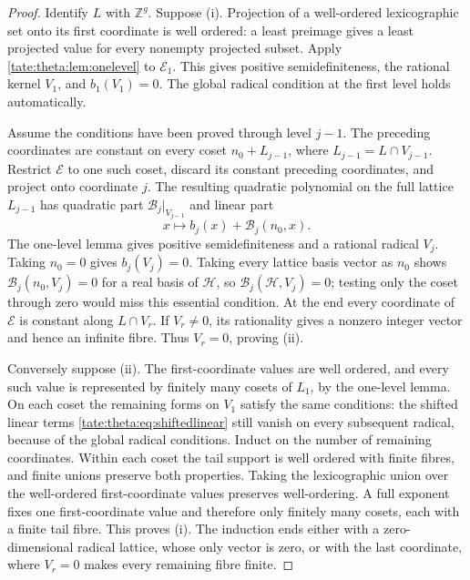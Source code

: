 \documentclass[11pt,letterpaper]{article}
\theoremstyle{definition}
\newcommand{\Z}{\mathbb Z}
\newcommand{\cB}{\mathcal B}
\newcommand{\cH}{\mathcal H}
\newcommand{\cE}{\mathcal E}
\begin{document}
\begin{proof}
Identify $L$ with $\Z^g$. Suppose (i). Projection of a well-ordered
lexicographic set onto its first coordinate is well ordered: a least
preimage gives a least projected value for every nonempty projected subset.
Apply \cref{tate:theta:lem:onelevel} to $\cE_1$. This gives positive
semidefiniteness, the rational kernel $V_1$, and $b_1(V_1)=0$. The global
radical condition at the first level holds automatically.

Assume the conditions have been proved through level $j-1$. The preceding
coordinates are constant on every coset $n_0+L_{j-1}$, where
$L_{j-1}=L\cap V_{j-1}$. Restrict $\cE$ to one such coset, discard its
constant preceding coordinates, and project onto coordinate $j$. The
resulting quadratic polynomial on the full lattice $L_{j-1}$ has quadratic
part $\cB_j|_{V_{j-1}}$ and linear part
\begin{equation}
 x\longmapsto b_j(x)+\cB_j(n_0,x).\label{tate:theta:eq:shiftedlinear}
\end{equation}
The one-level lemma gives positive semidefiniteness and a rational radical
$V_j$. Taking $n_0=0$ gives $b_j(V_j)=0$. Taking every lattice basis vector
as $n_0$ shows $\cB_j(n_0,V_j)=0$ for a real basis of $\cH$, so
$\cB_j(\cH,V_j)=0$; testing only the coset through zero would miss this
essential condition. At the end every coordinate of $\cE$ is constant along
$L\cap V_r$. If $V_r\ne0$, its rationality gives a nonzero integer vector
and hence an infinite fibre. Thus $V_r=0$, proving (ii).

Conversely suppose (ii). The first-coordinate values are well ordered, and
every such value is represented by finitely many cosets of $L_1$, by the
one-level lemma. On each coset the remaining forms on $V_1$ satisfy the
same conditions: the shifted linear terms
\eqref{tate:theta:eq:shiftedlinear} still vanish on every subsequent radical,
because of the global radical conditions. Induct on the number of remaining
coordinates. Within each coset the tail support is well ordered with finite
fibres, and finite unions preserve both properties. Taking the
lexicographic union over the well-ordered first-coordinate values preserves
well-ordering. A full exponent fixes one first-coordinate value and
therefore only finitely many cosets, each with a finite tail fibre. This
proves (i). The induction ends either with a zero-dimensional radical
lattice, whose only vector is zero, or with the last coordinate, where
$V_r=0$ makes every remaining fibre finite.
\end{proof}
\end{document}
